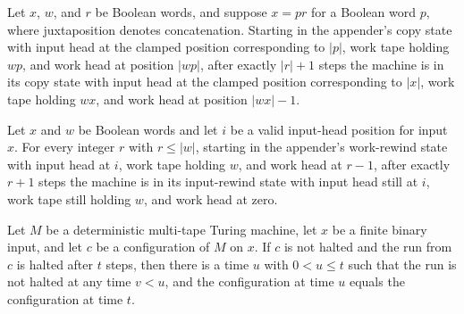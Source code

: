 \begin{lemma}
\label{Complexity.satAppend_copy}
\leanok
{}
Let $x$, $w$, and $r$ be Boolean words, and suppose $x=p r$ for a Boolean word $p$,
where juxtaposition denotes concatenation. Starting in the appender's copy state with
input head at the clamped position corresponding to $|p|$, work tape holding $w p$, and
work head at position $|w p|$, after exactly $|r|+1$ steps the machine is in its copy
state with input head at the clamped position corresponding to $|x|$, work tape holding
$w x$, and work head at position $|w x|-1$.
\end{lemma}

\begin{lemma}
\label{Complexity.satAppend_rewind}
\leanok
{}
Let $x$ and $w$ be Boolean words and let $i$ be a valid input-head position for input
$x$. For every integer $r$ with $r\le |w|$, starting in the appender's work-rewind state
with input head at $i$, work tape holding $w$, and work head at $r-1$, after exactly
$r+1$ steps the machine is in its input-rewind state with input head still at $i$, work
tape still holding $w$, and work head at zero.
\end{lemma}

\begin{lemma}
\label{Complexity.sat_call_first_halt}
\leanok
{}
Let $M$ be a deterministic multi-tape Turing machine, let $x$ be a finite binary input,
and let $c$ be a configuration of $M$ on $x$. If $c$ is not halted and the run from $c$
is halted after $t$ steps, then there is a time $u$ with $0<u\le t$ such that the run is
not halted at any time $v<u$, and the configuration at time $u$ equals the configuration
at time $t$.
\end{lemma}

